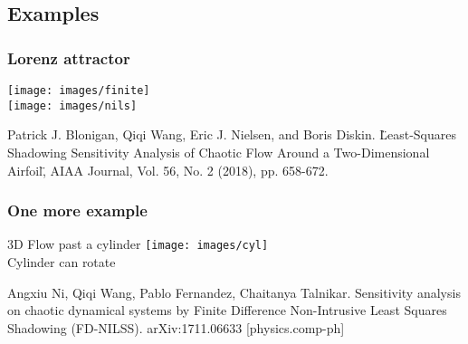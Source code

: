 \documentclass{beamer}
\begin{document}
\subsection{Examples}

\begin{frame}
  \frametitle{Lorenz attractor}
  \begin{center}

    \texttt{[image: images/finite]}\\

  \texttt{[image: images/nils]}

\tiny{Patrick J. Blonigan, Qiqi Wang, Eric J. Nielsen, and Boris Diskin.  \"Least-Squares Shadowing Sensitivity Analysis of Chaotic Flow Around a Two-Dimensional Airfoil\", AIAA Journal, Vol. 56, No. 2 (2018), pp. 658-672.}
\end{center}
\end{frame}

%
%
%
%

\begin{frame}
  \frametitle{One more example}
  \begin{center}


  3D Flow past a cylinder
  \texttt{[image: images/cyl]}\\

  Cylinder can rotate\\

\end{center}

\tiny{Angxiu Ni, Qiqi Wang, Pablo Fernandez, Chaitanya Talnikar. Sensitivity analysis on chaotic dynamical systems by Finite Difference Non-Intrusive Least Squares Shadowing (FD-NILSS).	arXiv:1711.06633 [physics.comp-ph]}
\end{frame}
\end{document}
